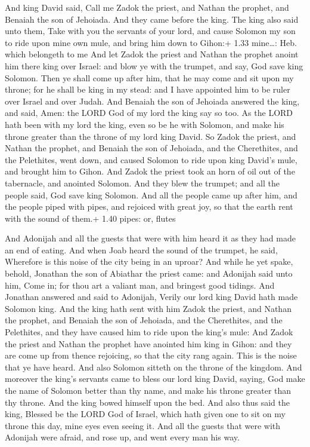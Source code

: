  And king David said, Call me Zadok the priest, and
Nathan the prophet, and Benaiah the son of Jehoiada. And they came
before the king.  The king also said unto them, Take with
you the servants of your lord, and cause Solomon my son to ride upon
mine own mule, and bring him down to Gihon:+ 1.33 mine\ldots: Heb. which
belongeth to me  And let Zadok the priest and Nathan the
prophet anoint him there king over Israel: and blow ye with the trumpet,
and say, God save king Solomon.  Then ye shall come up
after him, that he may come and sit upon my throne; for he shall be king
in my stead: and I have appointed him to be ruler over Israel and over
Judah.  And Benaiah the son of Jehoiada answered the king,
and said, Amen: the LORD God of my lord the king say so too.
 As the LORD hath been with my lord the king, even so be he
with Solomon, and make his throne greater than the throne of my lord
king David.  So Zadok the priest, and Nathan the prophet,
and Benaiah the son of Jehoiada, and the Cherethites, and the
Pelethites, went down, and caused Solomon to ride upon king David's
mule, and brought him to Gihon.  And Zadok the priest took
an horn of oil out of the tabernacle, and anointed Solomon. And they
blew the trumpet; and all the people said, God save king Solomon.
 And all the people came up after him, and the people piped
with pipes, and rejoiced with great joy, so that the earth rent with the
sound of them.+ 1.40 pipes: or, flutes

 And Adonijah and all the guests that were with him heard
it as they had made an end of eating. And when Joab heard the sound of
the trumpet, he said, Wherefore is this noise of the city being in an
uproar?  And while he yet spake, behold, Jonathan the son
of Abiathar the priest came: and Adonijah said unto him, Come in; for
thou art a valiant man, and bringest good tidings.  And
Jonathan answered and said to Adonijah, Verily our lord king David hath
made Solomon king.  And the king hath sent with him Zadok
the priest, and Nathan the prophet, and Benaiah the son of Jehoiada, and
the Cherethites, and the Pelethites, and they have caused him to ride
upon the king's mule:  And Zadok the priest and Nathan the
prophet have anointed him king in Gihon: and they are come up from
thence rejoicing, so that the city rang again. This is the noise that ye
have heard.  And also Solomon sitteth on the throne of the
kingdom.  And moreover the king's servants came to bless
our lord king David, saying, God make the name of Solomon better than
thy name, and make his throne greater than thy throne. And the king
bowed himself upon the bed.  And also thus said the king,
Blessed be the LORD God of Israel, which hath given one to sit on my
throne this day, mine eyes even seeing it.  And all the
guests that were with Adonijah were afraid, and rose up, and went every
man his way.

